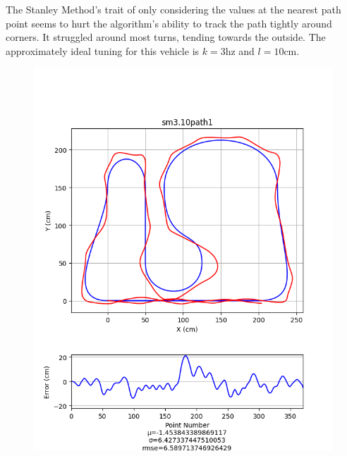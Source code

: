 \documentclass[mla7]{mla}
\begin{document}
\begin{paper}
The Stanley Method's trait of only considering the values at the nearest path point seems to hurt the algorithm's ability to track the path tightly around corners. It struggled around most turns, tending towards the outside. The approximately ideal tuning for this vehicle is $k=3$hz and $l=10$cm.

\begin{figure}[H]
\includegraphics[width=\linewidth]{pathData/smpath1}
\endminipage\hfill
{}

\end{figure}
\end{paper}
\end{document}
